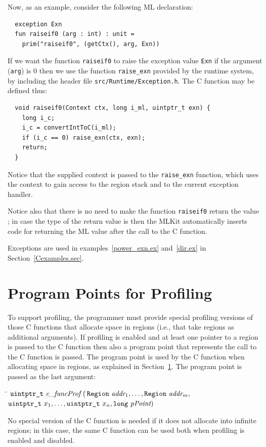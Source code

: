 \documentclass[12pt]{book}
\begin{document}
\noindent
Now, as an example, consider the following ML declaration:
\begin{verbatim}
  exception Exn
  fun raiseif0 (arg : int) : unit =
    prim("raiseif0", (getCtx(), arg, Exn))
\end{verbatim}
If we want the function \texttt{raiseif0} to raise the exception value
\texttt{Exn} if the argument (\texttt{arg}) is 0 then we use the
function \verb|raise_exn| provided by the runtime system, by
including the header file {\tt src/Runtime/Exception.h}. The C
function  may be defined thus:
\begin{verbatim}
  void raiseif0(Context ctx, long i_ml, uintptr_t exn) {
    long i_c;
    i_c = convertIntToC(i_ml);
    if (i_c == 0) raise_exn(ctx, exn);
    return;
  }
\end{verbatim}
Notice that the supplied context is passed to the \texttt{raise\_exn}
function, which uses the context to gain access to the region stack
and to the current exception handler.

Notice also that there is no need to make the function
\texttt{raiseif0} return the value ; in case the type of
the return value is  then the MLKit automatically inserts
code for returning the ML value \boxml{()} after the call to the C
function.

Exceptions are used in examples~\ref{power_exn.ex} and~\ref{dir.ex} in
Section~\ref{Cexamples.sec}.

\section{Program Points for Profiling}
\label{prof.sec}
To support profiling, the programmer must provide special profiling
versions of those C functions that allocate space in regions (i.e.,
that take regions as additional arguments). If profiling is enabled
and at least one pointer to a region is passed to the C function then
also a program point that represents the call to the C function is
passed.  The program point is used by the C function when allocating
space in regions, as explained in Section~\ref{prof.sec}. The program
point is passed as the last argument:
\begin{tabbing}
\indent\=  $\texttt{uintptr\_t} \ \emph{c\_funcProf} \ ($\=$\texttt{Region}\ \emph{addr}_1,
    \ldots, \texttt{Region}\ \emph{addr}_m,$\\
  \>\>$ \texttt{uintptr\_t}\ x_1, \ldots,
    \texttt{uintptr\_t}\ x_n, \texttt{long}\ \emph{pPoint}) $
\end{tabbing}
\noindent
No special version of the C function is needed if it does not allocate
into infinite regions; in this case, the same C function can be used
both when profiling is enabled and disabled.
\end{document}
